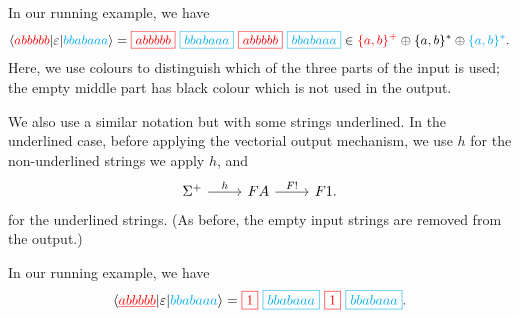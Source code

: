 \begin{example}
    In our running example, we have
    \begin{align*}
        \tuple{\red{abbbbb} | \varepsilon | \blue{bbabaaa}} =  
        \red{\boxed{abbbbb}} \ 
        \blue{\boxed{bbabaaa}} \ 
        \red{\boxed{abbbbb}} \ 
        \blue{\boxed{bbabaaa}} \in \red{\set{a,b}^+} \oplus \set{a,b}^*  \oplus \blue{\set{a,b}^*}.
        \end{align*}
    Here, we use colours to distinguish which of the three parts of the input is used; the empty middle part has black colour which is not used in the output.
\end{example}


We also use a similar notation but with some strings underlined. In the underlined case, before applying the vectorial output mechanism, we use $h$ for the non-underlined strings we apply $h$, and
\[
\begin{tikzcd}
\Sigma^+ 
\ar[r,"h"]
&
\functor A 
\ar[r,"\functor !"]
&
\functor 1.
\end{tikzcd}
\]
for the underlined strings. (As before, the empty input strings are removed from the output.)
\begin{example}
    In our running example, we have
    \begin{align*}
        \tuple{\red{\underline{abbbbb}} | \varepsilon | \blue{bbabaaa}} =  
        \red{\boxed{1}} \ 
        \blue{\boxed{bbabaaa}} \ 
        \red{\boxed{1}} \ 
        \blue{\boxed{bbabaaa}}.
        \end{align*}
\end{example}




